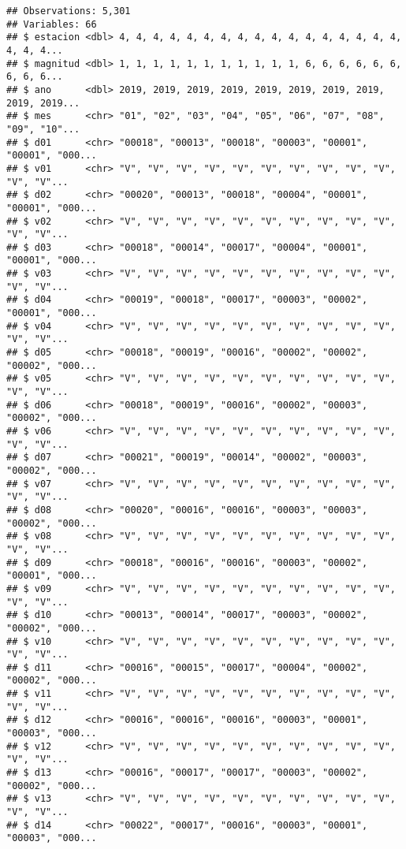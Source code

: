 \documentclass[]{article}
\begin{document}
\begin{verbatim}
## Observations: 5,301
## Variables: 66
## $ estacion <dbl> 4, 4, 4, 4, 4, 4, 4, 4, 4, 4, 4, 4, 4, 4, 4, 4, 4, 4, 4, 4...
## $ magnitud <dbl> 1, 1, 1, 1, 1, 1, 1, 1, 1, 1, 1, 6, 6, 6, 6, 6, 6, 6, 6, 6...
## $ ano      <dbl> 2019, 2019, 2019, 2019, 2019, 2019, 2019, 2019, 2019, 2019...
## $ mes      <chr> "01", "02", "03", "04", "05", "06", "07", "08", "09", "10"...
## $ d01      <chr> "00018", "00013", "00018", "00003", "00001", "00001", "000...
## $ v01      <chr> "V", "V", "V", "V", "V", "V", "V", "V", "V", "V", "V", "V"...
## $ d02      <chr> "00020", "00013", "00018", "00004", "00001", "00001", "000...
## $ v02      <chr> "V", "V", "V", "V", "V", "V", "V", "V", "V", "V", "V", "V"...
## $ d03      <chr> "00018", "00014", "00017", "00004", "00001", "00001", "000...
## $ v03      <chr> "V", "V", "V", "V", "V", "V", "V", "V", "V", "V", "V", "V"...
## $ d04      <chr> "00019", "00018", "00017", "00003", "00002", "00001", "000...
## $ v04      <chr> "V", "V", "V", "V", "V", "V", "V", "V", "V", "V", "V", "V"...
## $ d05      <chr> "00018", "00019", "00016", "00002", "00002", "00002", "000...
## $ v05      <chr> "V", "V", "V", "V", "V", "V", "V", "V", "V", "V", "V", "V"...
## $ d06      <chr> "00018", "00019", "00016", "00002", "00003", "00002", "000...
## $ v06      <chr> "V", "V", "V", "V", "V", "V", "V", "V", "V", "V", "V", "V"...
## $ d07      <chr> "00021", "00019", "00014", "00002", "00003", "00002", "000...
## $ v07      <chr> "V", "V", "V", "V", "V", "V", "V", "V", "V", "V", "V", "V"...
## $ d08      <chr> "00020", "00016", "00016", "00003", "00003", "00002", "000...
## $ v08      <chr> "V", "V", "V", "V", "V", "V", "V", "V", "V", "V", "V", "V"...
## $ d09      <chr> "00018", "00016", "00016", "00003", "00002", "00001", "000...
## $ v09      <chr> "V", "V", "V", "V", "V", "V", "V", "V", "V", "V", "V", "V"...
## $ d10      <chr> "00013", "00014", "00017", "00003", "00002", "00002", "000...
## $ v10      <chr> "V", "V", "V", "V", "V", "V", "V", "V", "V", "V", "V", "V"...
## $ d11      <chr> "00016", "00015", "00017", "00004", "00002", "00002", "000...
## $ v11      <chr> "V", "V", "V", "V", "V", "V", "V", "V", "V", "V", "V", "V"...
## $ d12      <chr> "00016", "00016", "00016", "00003", "00001", "00003", "000...
## $ v12      <chr> "V", "V", "V", "V", "V", "V", "V", "V", "V", "V", "V", "V"...
## $ d13      <chr> "00016", "00017", "00017", "00003", "00002", "00002", "000...
## $ v13      <chr> "V", "V", "V", "V", "V", "V", "V", "V", "V", "V", "V", "V"...
## $ d14      <chr> "00022", "00017", "00016", "00003", "00001", "00003", "000...

\end{verbatim}
\end{document}
